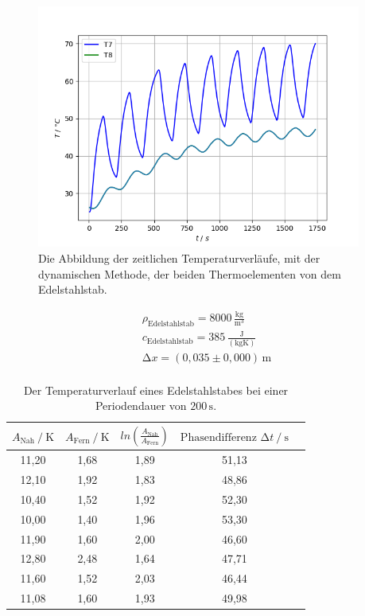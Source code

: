 \begin{figure}[H]
    \centering
    \includegraphics[height=80mm]{bilder/TemprVerlDyT7T8.png}
    \caption{Die Abbildung der zeitlichen Temperaturverläufe, mit der dynamischen Methode, der beiden Thermoelementen von dem Edelstahlstab.\label{Abbildung8} }
\end{figure}

\begin{align*}
    \rho_{\text{Edelstahlstab}} = 8000\,\frac{\unit{\kilo\gram}}{\unit{\meter^3}}\\
    c_{\text{Edelstahlstab}} = 385\, \frac{\unit{\joule}}{(\unit{\kilo\gram\kelvin})} \\
    \increment x = (0,035 \pm 0,000)\,\unit{\meter}\\
\end{align*}

\begin{table}[H]
    \centering
    \caption{Der Temperaturverlauf eines Edelstahlstabes bei einer Periodendauer von $200\,\unit{\second}$.}
    \label{Tabelle4}
    \begin{tabular} {c     c     c     c     c}
        \toprule
        {$ A_{\text{Nah}}  \mathbin{/} \unit{\kelvin} $} &
        {$ A_{\text{Fern}} \mathbin{/} \unit{\kelvin}$} &
        {$ ln\left(\frac{A_{\text{Nah}}}{A_{\text{Fern}}}\right)$} &
        {$ \text{Phasendifferenz}\,\, \increment t  \mathbin{/} \unit{\second} $} \\
        \midrule
        11,20 & 1,68 & 1,89 & 51,13 \\
        12,10 & 1,92 & 1,83 & 48,86 \\
        10,40 & 1,52 & 1,92 & 52,30 \\
        10,00 & 1,40 & 1,96 & 53,30 \\
        11,90 & 1,60 & 2,00 & 46,60 \\
        12,80 & 2,48 & 1,64 & 47,71 \\
        11,60 & 1,52 & 2,03 & 46,44 \\
        11,08 & 1,60 & 1,93 & 49,98 \\
        \bottomrule
    \end{tabular} 
\end{table}

